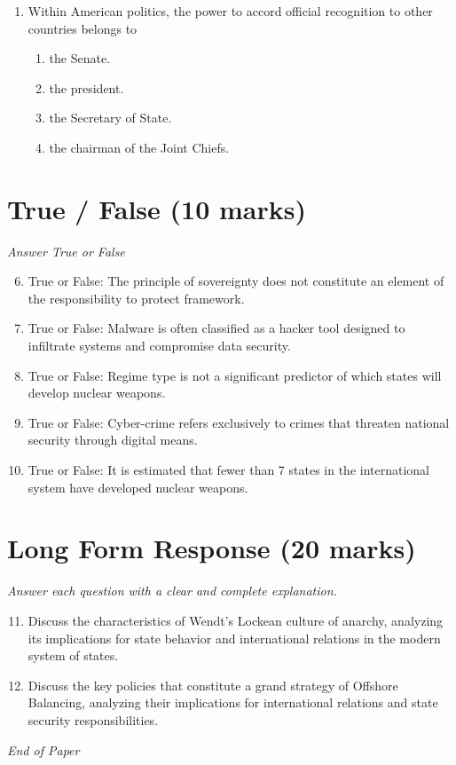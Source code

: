\documentclass[12pt]{article}
\begin{document}
\begin{enumerate}[label=\arabic*.]
\begin{enumerate}[label=(\alph*)]
    \item The US unreservedly supported decolonization
    \item None of the above
\end{enumerate}
\item Within American politics, the power to accord official recognition to other countries belongs to
\begin{enumerate}[label=(\alph*)]
    \item the Senate.
    \item the president.
    \item the Secretary of State.
    \item the chairman of the Joint Chiefs.
\end{enumerate}
\end{enumerate}

\section*{True / False (10 marks)}
\textit{Answer True or False}
\begin{enumerate}[label=\arabic*.]
\setcounter{enumi}{5}
\item True or False: The principle of sovereignty does not constitute an element of the responsibility to protect framework.
\item True or False: Malware is often classified as a hacker tool designed to infiltrate systems and compromise data security.
\item True or False: Regime type is not a significant predictor of which states will develop nuclear weapons.
\item True or False: Cyber-crime refers exclusively to crimes that threaten national security through digital means.
\item True or False: It is estimated that fewer than 7 states in the international system have developed nuclear weapons.
\end{enumerate}

\section*{Long Form Response (20 marks)}
\textit{Answer each question with a clear and complete explanation.}
\begin{enumerate}[label=\arabic*.]
\setcounter{enumi}{10}
\item Discuss the characteristics of Wendt's Lockean culture of anarchy, analyzing its implications for state behavior and international relations in the modern system of states.
\item Discuss the key policies that constitute a grand strategy of Offshore Balancing, analyzing their implications for international relations and state security responsibilities.
\end{enumerate}

\vfill
\noindent\textit{End of Paper}
\end{document}
